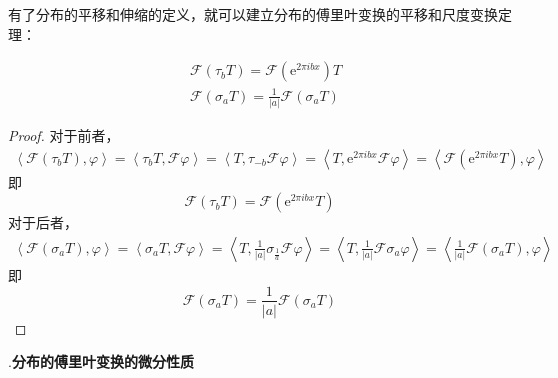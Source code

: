 \documentclass{ctexbook}
\begin{document}
有了分布的平移和伸缩的定义，就可以建立分布的傅里叶变换的平移和尺度变换定理：
\begin{theorem}[分布的傅里叶变换的平移和尺度变换]
\begin{align*}
    &\mathcal{F}(\tau_b T)=\mathcal{F}(\mathrm{e}^{2\pi ibx})T\\
    &\mathcal{F}(\sigma_a T)=\frac{1}{|a|}\mathcal{F}(\sigma_a T)
\end{align*}
\end{theorem}
\begin{proof}
    对于前者，
        \begin{align*}
    \left\langle\mathcal{F}(\tau_b T),\varphi\right\rangle =\left\langle \tau_b T,\mathcal{F}\varphi\right\rangle=\left\langle T,\tau_{-b}\mathcal{F}\varphi\right\rangle=\left\langle T,\mathrm{e}^{2\pi ibx}\mathcal{F}\varphi\right\rangle=\left\langle \mathcal{F}(\mathrm{e}^{2\pi ibx}T),\varphi\right\rangle
\end{align*}
即\[\mathcal{F}(\tau_b T)=\mathcal{F}(\mathrm{e}^{2\pi ibx}T)\]
对于后者，
\begin{align*}
    \left\langle\mathcal{F}(\sigma_a T),\varphi\right\rangle =\left\langle \sigma_a T,\mathcal{F}\varphi\right\rangle=\left\langle T,\frac{1}{|a|}\sigma_{\frac{1}{a}}\mathcal{F}\varphi\right\rangle=\left\langle T,\frac{1}{|a|}\mathcal{F}\sigma_a \varphi\right\rangle=\left\langle \frac{1}{|a|}\mathcal{F}(\sigma_a T),\varphi\right\rangle
\end{align*}
即\[\mathcal{F}(\sigma_a T)=\frac{1}{|a|}\mathcal{F}(\sigma_a T)\]
\end{proof}

.\textbf{分布的傅里叶变换的微分性质}
\end{document}
